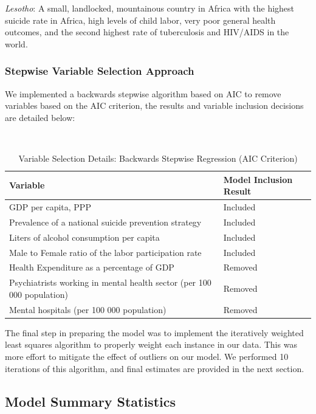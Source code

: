 \documentclass[]{article}
\begin{document}
\emph{Lesotho}: A small, landlocked, mountainous country in Africa with
the highest suicide rate in Africa, high levels of child labor, very
poor general health outcomes, and the second highest rate of
tuberculosis and HIV/AIDS in the world.

\subsubsection{Stepwise Variable Selection
Approach}\label{stepwise-variable-selection-approach}

We implemented a backwards stepwise algorithm based on AIC to remove
variables based on the AIC criterion, the results and variable inclusion
decisions are detailed below:

\begin{table}[H]
\centering 
\caption{Variable Selection Details: Backwards Stepwise Regression (AIC Criterion)}
\
\begin{tabular}{p{5cm}p{4cm}}  
\hline  
Variable & Model Inclusion Result \\  
\hline
GDP per capita, PPP & Included \\
\hline 
Prevalence of a national suicide prevention strategy & Included \\
\hline 
Liters of alcohol consumption per capita & Included \\
\hline 
Male to Female ratio of the labor participation rate & Included \\
\hline
Health Expenditure as a percentage of GDP & Removed \\
 \hline 
Psychiatrists working in mental health sector (per 100 000 population) & Removed \\   
\hline 
Mental hospitals (per 100 000 population) &  Removed \\
\hline 
\end{tabular} 
\end{table}

The final step in preparing the model was to implement the iteratively
weighted least squares algorithm to properly weight each instance in our
data. This was more effort to mitigate the effect of outliers on our
model. We performed 10 iterations of this algorithm, and final estimates
are provided in the next section.

\subsection{Model Summary Statistics}\label{model-summary-statistics}
\end{document}
